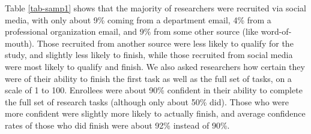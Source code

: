 \documentclass[
  letterpaper,
  DIV=11,
  numbers=noendperiod]{scrartcl}
\begin{document}
Table \ref{tab-samp1} shows that the majority of researchers were
recruited via social media, with only about 9\% coming from a department
email, 4\% from a professional organization email, and 9\% from some
other source (like word-of-mouth). Those recruited from another source
were less likely to qualify for the study, and slightly less likely to
finish, while those recruited from social media were most likely to
qualify and finish. We also asked researchers how certain they were of
their ability to finish the first task as well as the full set of tasks,
on a scale of 1 to 100. Enrollees were about 90\% confident in their
ability to complete the full set of research tasks (although only about
50\% did). Those who were more confident were slightly more likely to
actually finish, and average confidence rates of those who did finish
were about 92\% instead of 90\%.

\begin{table}[!htbp] \centering \renewcommand*{\arraystretch}{1.1}\caption{Researcher Recruitment Source and Completion Confidence}\label{tab-samp1}
\end{table}
\end{document}
